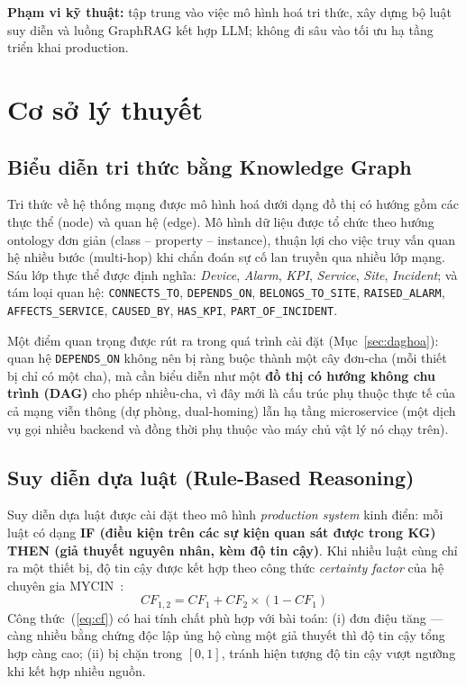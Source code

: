 \documentclass[12pt,a4paper]{report}
\newcommand{\code}[1]{\texttt{\small #1}}
\begin{document}
\textbf{Phạm vi kỹ thuật:} tập trung vào việc mô hình hoá tri thức, xây dựng bộ luật suy diễn và
luồng GraphRAG kết hợp LLM; không đi sâu vào tối ưu hạ tầng triển khai production.

\chapter{Cơ sở lý thuyết}

\section{Biểu diễn tri thức bằng Knowledge Graph}

Tri thức về hệ thống mạng được mô hình hoá dưới dạng đồ thị có hướng gồm các thực thể (node) và
quan hệ (edge). Mô hình dữ liệu được tổ chức theo hướng ontology đơn giản (class -- property --
instance), thuận lợi cho việc truy vấn quan hệ nhiều bước (multi-hop) khi chẩn đoán sự cố lan
truyền qua nhiều lớp mạng. Sáu lớp thực thể được định nghĩa: \emph{Device}, \emph{Alarm},
\emph{KPI}, \emph{Service}, \emph{Site}, \emph{Incident}; và tám loại quan hệ:
\code{CONNECTS\_TO}, \code{DEPENDS\_ON}, \code{BELONGS\_TO\_SITE}, \code{RAISED\_ALARM},
\code{AFFECTS\_SERVICE}, \code{CAUSED\_BY}, \code{HAS\_KPI}, \code{PART\_OF\_INCIDENT}.

Một điểm quan trọng được rút ra trong quá trình cài đặt (Mục~\ref{sec:daghoa}): quan hệ
\code{DEPENDS\_ON} không nên bị ràng buộc thành một cây đơn-cha (mỗi thiết bị chỉ có một cha), mà
cần biểu diễn như một \textbf{đồ thị có hướng không chu trình (DAG)} cho phép nhiều-cha, vì đây mới
là cấu trúc phụ thuộc thực tế của cả mạng viễn thông (dự phòng, dual-homing) lẫn hạ tầng
microservice (một dịch vụ gọi nhiều backend và đồng thời phụ thuộc vào máy chủ vật lý nó chạy
trên).

\section{Suy diễn dựa luật (Rule-Based Reasoning)}

Suy diễn dựa luật được cài đặt theo mô hình \emph{production system} kinh điển: mỗi luật có dạng
\textbf{IF (điều kiện trên các sự kiện quan sát được trong KG) THEN (giả thuyết nguyên nhân, kèm
độ tin cậy)}. Khi nhiều luật cùng chỉ ra một thiết bị, độ tin cậy được kết hợp theo công thức
\emph{certainty factor} của hệ chuyên gia MYCIN~\cite{shortliffe1975mycin}:
\begin{equation}
    CF_{1,2} = CF_1 + CF_2 \times (1 - CF_1)
    \label{eq:cf}
\end{equation}
Công thức~(\ref{eq:cf}) có hai tính chất phù hợp với bài toán: (i) đơn điệu tăng --- càng nhiều
bằng chứng độc lập ủng hộ cùng một giả thuyết thì độ tin cậy tổng hợp càng cao; (ii) bị chặn trong
$[0,1]$, tránh hiện tượng độ tin cậy vượt ngưỡng khi kết hợp nhiều nguồn.
\end{document}
